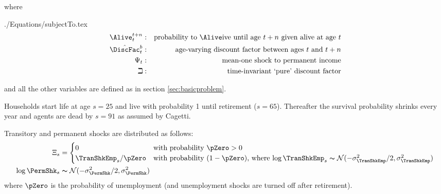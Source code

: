 \documentclass[titlepage, headings=optiontotocandhead]{\econtex}
\begin{document}
where
\begin{verbatimwrite}{./Equations/subjectTo.tex}
  \begin{equation*}\begin{gathered}\begin{aligned}
        \Alive _{t}^{t+n} &:&\text{probability to }\Alive\text{ive until age $t+n$ given alive at age $t$}
        \\      \byage{\DiscFac}_{t}^{b} &:&\text{age-varying discount factor between ages $t$ and $t+n$}
        \\     \Psi_{t} &:&\text{mean-one shock to permanent income}
        \\     \beth &:&\text{time-invariant `pure' discount factor}
      \end{aligned}\end{gathered}\end{equation*}
\end{verbatimwrite}
\unskip
and all the other variables are defined as in section \ref{sec:basicproblem}.

Households start life at age $s=25$ and live with probability 1 until retirement
($s=65$). Thereafter the survival probability shrinks every year and
agents are dead by $s=91$ as assumed by Cagetti. %

Transitory and permanent shocks are distributed as follows:
\begin{equation}\begin{gathered}\begin{aligned}
      \Xi_{s} & = 
      \begin{cases}
        0\phantom{/\pZero} & \text{with probability $\pZero>0$} \\
        \TranShkEmp_{s}/\pZero      & \text{with probability $(1-\pZero)$, where $\log \TranShkEmp_{s}\thicksim \mathcal{N}(-\sigma_{\TranShkEmp}^{2}/2,\sigma_{\TranShkEmp}^{2})$}\\
      \end{cases}\\
      \log \PermShk_{s} &\thicksim \mathcal{N}(-\sigma_{\PermShk}^{2}/2,\sigma_{\PermShk}^{2})
    \end{aligned}\end{gathered}\end{equation}
where $\pZero$ is the probability of unemployment (and unemployment shocks are turned off after retirement).
\end{document}
